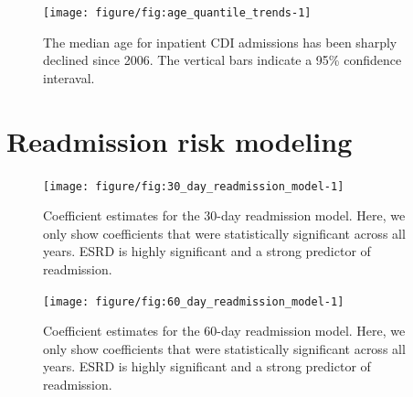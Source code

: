 \documentclass[12pt]{ociamthesis}\usepackage[]{graphicx}\usepackage[]{color}
\newenvironment{knitrout}{}{} %
\begin{document}
\begin{knitrout}
\color{fgcolor}\begin{figure}

{\centering \texttt{[image: figure/fig:age\_quantile\_trends-1]} 

}

\caption[The median age for inpatient CDI admissions has been sharply declined since 2006]{The median age for inpatient CDI admissions has been sharply declined since 2006. The vertical bars indicate a 95\% confidence interaval.}\label{fig:fig:age_quantile_trends}
\end{figure}


\end{knitrout}

\label{fig:age_trends}



\section{Readmission risk modeling}








\begin{knitrout}
\color{fgcolor}\begin{figure}

{\centering \texttt{[image: figure/fig:30\_day\_readmission\_model-1]} 

}

\caption[Coefficient estimates for the 30-day readmission model]{Coefficient estimates for the 30-day readmission model. Here, we only show coefficients that were statistically significant across all years. ESRD is highly significant and a strong predictor of readmission.}\label{fig:fig:30_day_readmission_model}
\end{figure}


\end{knitrout}

\begin{knitrout}
\color{fgcolor}\begin{figure}

{\centering \texttt{[image: figure/fig:60\_day\_readmission\_model-1]} 

}

\caption[Coefficient estimates for the 60-day readmission model]{Coefficient estimates for the 60-day readmission model. Here, we only show coefficients that were statistically significant across all years. ESRD is highly significant and a strong predictor of readmission.}\label{fig:fig:60_day_readmission_model}
\end{figure}


\end{knitrout}
\end{document}
